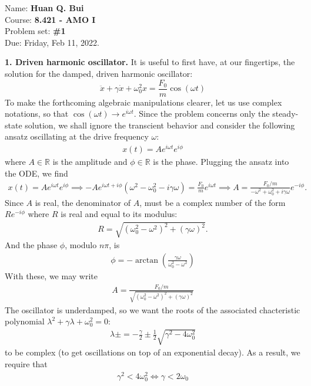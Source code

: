 \documentclass{article}
\theoremstyle{definition}
\newcommand{\f}[2]{\frac{#1}{#2}}
\newcommand{\lp}{\left(}
\newcommand{\rp}{\right)}
\begin{document}
\begin{framed}
\noindent Name: \textbf{Huan Q. Bui}\\
Course: \textbf{8.421 - AMO I}\\
Problem set: \textbf{\#1}\\
Due: Friday, Feb 11, 2022.
\end{framed}
	
	
\noindent \textbf{1. Driven harmonic oscillator.} It is useful to first have, at our fingertips, the solution for the damped, driven harmonic oscillator:
\begin{equation*}
\ddot x + \gamma \dot x + \omega_0^2 x = \f{F_0}{m}\cos(\omega t)
\end{equation*}
To make the forthcoming algebraic manipulations clearer, let us use complex notations, so that $\cos(\omega t) \to e^{i\omega t}$. Since the problem concerns only the steady-state solution, we shall ignore the transcient behavior and consider the following ansatz oscillating at the drive frequency $\omega$:
\begin{align*}
x(t) = A e^{i\omega t } e^{i\phi}
\end{align*}
where $A \in \mathbb{R}$ is the amplitude and $\phi \in \mathbb{R}$ is the phase. Plugging the ansatz into the ODE, we find 
\begin{align*}
x(t) = A e^{i\omega t} e^{i\phi} \implies -A e^{i \omega t + i\phi} \lp \omega^2 -\omega_0^2 - i\gamma \omega \rp = \f{F_0}{m}e^{i\omega t} \implies A = \f{F_0/m}{-\omega^2 + \omega_0^2 + i\gamma \omega} e^{-i\phi}.
\end{align*}
Since $A$ is real, the denominator of $A$, must be a complex number of the form $R e^{-i\phi}$ where $R$ is real and equal to its modulus:
\begin{align*}
R = \sqrt{{(\omega_0^2 - \omega^2)}^2 + (\gamma \omega)^2}.
\end{align*}
And the phase $\phi$, modulo $n\pi$, is
\begin{align*}
\boxed{\phi = -\arctan(\f{\gamma\omega}{\omega_0^2 - \omega^2})}
\end{align*}
With these, we may write
\begin{align*}
\boxed{A = \f{F_0/m}{\sqrt{(\omega_0^2 - \omega^2)^2 + (\gamma \omega)^2}}}
\end{align*}
The oscillator is underdamped, so we want the roots of the associated chacteristic polynomial $\lambda^2 + \gamma \lambda + \omega_0^2 = 0$:
\begin{align*}
\lambda\pm = -\f{\gamma}{2} \pm \f{1}{2}\sqrt{\gamma^2 - 4\omega_0^2}
\end{align*}
to be complex (to get oscillations on top of an exponential decay). As a result, we require that 
\begin{align*}
\gamma^2 < 4\omega_0^2 \iff \boxed{\gamma < 2\omega_0}
\end{align*}
\end{document}
